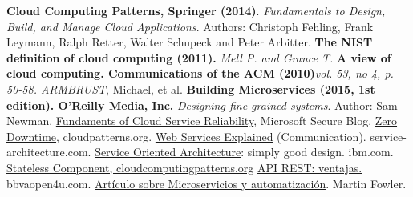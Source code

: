 \begin{thebibliography}{1}
\textbf{Cloud Computing Patterns, Springer (2014)}. \textit{Fundamentals to Design, Build, and Manage Cloud Applications}. Authors: Christoph Fehling, Frank Leymann, Ralph Retter, Walter Schupeck and Peter Arbitter.
\textbf{The NIST definition of cloud computing (2011).} \textit{Mell P. and Grance T.}
\textbf{A view of cloud computing. Communications of the ACM (2010)}\textit{vol. 53, no 4, p. 50-58. ARMBRUST}, Michael, et al.
\textbf{Building Microservices (2015, 1st edition). O'Reilly Media, Inc.} \textit{Designing fine-grained systems}. Author: Sam Newman.
\href{https://blogs.microsoft.com/microsoftsecure/2012/09/12/fundamentals-of-cloud-service-reliability/}{Fundaments of Cloud Service Reliability}, Microsoft Secure Blog.
\href{http://cloudpatterns.org/design_patterns/zero_downtime}{Zero Downtime}, cloudpatterns.org.
\href{http://www.service-architecture.com/articles/web-services/web_services_explained.html}{Web Services Explained} (Communication). service-architecture.com.
\href{https://www-01.ibm.com/software/solutions/soa/}{Service Oriented Architecture}: simply good design. ibm.com.
\href{http://www.cloudcomputingpatterns.org/stateless_component/}{Stateless Component, cloudcomputingpatterns.org}
\href{https://bbvaopen4u.com/es/actualidad/api-rest-que-es-y-cuales-son-sus-ventajas-en-el-desarrollo-de-proyectos}{API REST: ventajas.}  bbvaopen4u.com.
\href{https://martinfowler.com/articles/microservices.html}{Artículo sobre Microservicios y automatización}. Martin Fowler.
\end{thebibliography}

